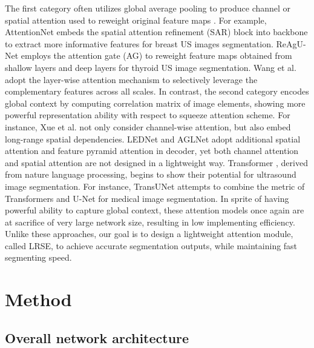 \documentclass[review]{elsarticle}
\begin{document}
The first category often utilizes global average pooling to produce channel or spatial attention used to reweight original feature maps \cite{woo2018cbam,2017Squeeze}. For example, AttentionNet\cite{li2019attentionnet} embeds the spatial attention refinement (SAR) block into backbone to extract more informative features for breast US images segmentation. ReAgU-Net \cite{ding2019automatic} employs the attention gate (AG) to reweight feature maps obtained from shallow layers and deep layers for thyroid US image segmentation. Wang et al.\cite{wang2019deep} adopt the layer-wise attention mechanism to selectively leverage the complementary features across all scales. In contrast, the second category \cite{2018non,2021global} encodes global context by computing correlation matrix of image elements, showing more powerful representation ability with respect to squeeze attention scheme. For instance, Xue et al.\cite{2021global} not only consider channel-wise attention, but also embed long-range spatial dependencies. LEDNet \cite{wang2019lednet} and AGLNet \cite{zhou2020aglnet} adopt additional spatial attention and feature pyramid attention in decoder, yet both channel attention and spatial attention are not designed in a lightweight way. Transformer \cite{vaswani2017attention,chen2021transunet,2021swin}, derived from nature language processing, begins to show their potential for ultrasound image segmentation. For instance, TransUNet \cite{chen2021transunet} attempts to combine the metric of Transformers \cite{vaswani2017attention} and U-Net \cite{2015U} for medical image segmentation. In sprite of having powerful ability to capture global context, these attention models once again are at sacrifice of very large network size, resulting in low implementing efficiency. Unlike these approaches, our goal is to design a lightweight attention	module, called LRSE, to achieve accurate segmentation outputs, while maintaining fast segmenting speed.

\section{Method}

\subsection{Overall network architecture}
\end{document}
